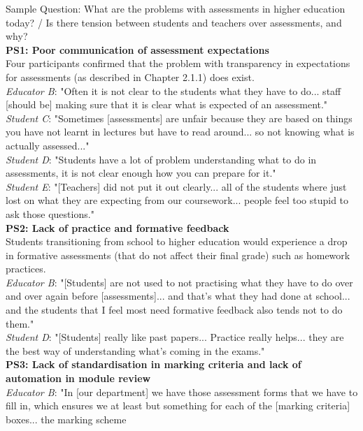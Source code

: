 Sample Question: What are the problems with assessments in higher education today? / 
Is there tension between students and teachers over assessments, and why? 
\vspace{0.25cm}\\
\textbf{PS1: Poor communication of assessment expectations}\\
Four participants confirmed that the problem with transparency in expectations for 
assessments (as described in Chapter 2.1.1) does exist.\\
\textit{Educator B}: "Often it is not clear to the students what they have to do... staff [should be] 
making sure that it is clear what is expected of an assessment."\\
\textit{Student C}: "Sometimes [assessments] are unfair because they are based on things you have 
not learnt in lectures but have to read around... so not knowing what is actually assessed..." \\
\textit{Student D}: "Students have a lot of problem understanding what to do in assessments, it is not clear enough 
how you can prepare for it."\\
\textit{Student E}: "[Teachers] did not put it out clearly... all of the students where just lost on what 
they are expecting from our coursework... people feel too stupid to ask those questions."
\vspace{0.25cm}\\
\textbf{PS2: Lack of practice and formative feedback}\\
Students transitioning from school to higher education would experience a drop in formative assessments
(that do not affect their final grade) such as homework practices.\\
\textit{Educator B}: "[Students] are not used to not practising what they have to do over and over again 
before [assessments]... and that's what they had done at school... and the students that I feel most need 
formative feedback also tends not to do them."\\
\textit{Student D}: "[Students] really like past papers... Practice really helps... they are the best 
way of understanding what's coming in the exams."
\vspace{0.25cm}\\
\textbf{PS3: Lack of standardisation in marking criteria and lack of automation in module review}\\
\textit{Educator B}: "In [our department] we have those assessment forms that we have to fill in, 
which ensures we at least but something for each of the [marking criteria] boxes... the marking scheme 
